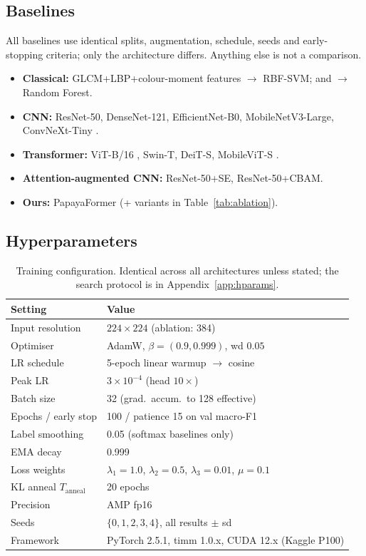\documentclass[10pt,twocolumn,a4paper]{article}
\begin{document}
\subsection{Baselines}
\label{sec:baselines}
All baselines use identical splits, augmentation, schedule, seeds and early-stopping criteria; only the architecture differs. Anything else is not a comparison.
\begin{itemize}[leftmargin=1.1em,itemsep=1pt,topsep=2pt]
\item \textbf{Classical:} GLCM+LBP+colour-moment features $\rightarrow$ RBF-SVM; and $\rightarrow$ Random Forest.
\item \textbf{CNN:} ResNet-50, DenseNet-121, EfficientNet-B0, MobileNetV3-Large, ConvNeXt-Tiny \cite{convnext2022}.
\item \textbf{Transformer:} ViT-B/16 \cite{vit2021}, Swin-T, DeiT-S, MobileViT-S \cite{mobilevit2022}.
\item \textbf{Attention-augmented CNN:} ResNet-50+SE, ResNet-50+CBAM.
\item \textbf{Ours:} PapayaFormer (+ variants in Table~\ref{tab:ablation}).
\end{itemize}

\subsection{Hyperparameters}
\begin{table}[H]
\centering
\caption{Training configuration. Identical across all architectures unless stated; the search protocol is in Appendix~\ref{app:hparams}.}
\label{tab:hparams}
{\footnotesize
\begin{tabularx}{\columnwidth}{@{}p{3.1cm} X@{}}
\toprule
\rowcolor{hdrgray}
Setting & Value \\
\midrule
Input resolution & $224\times224$ (ablation: 384) \\
Optimiser & AdamW, $\beta=(0.9,0.999)$, wd $0.05$ \\
LR schedule & 5-epoch linear warmup $\rightarrow$ cosine \\
Peak LR & $3\times10^{-4}$ (head $10\times$) \\
Batch size & 32 (grad.\ accum.\ to 128 effective) \\
Epochs / early stop & 100 / patience 15 on val macro-F1 \\
Label smoothing & 0.05 (softmax baselines only) \\
EMA decay & 0.999 \\
Loss weights & $\lambda_1{=}1.0$, $\lambda_2{=}0.5$, $\lambda_3{=}0.01$, $\mu{=}0.1$ \\
KL anneal $T_{\text{anneal}}$ & 20 epochs \\
Precision & AMP fp16 \\
Seeds & $\{0,1,2,3,4\}$, all results $\pm$ sd \\
Framework & PyTorch 2.5.1, timm 1.0.x, CUDA 12.x (Kaggle P100) \\
\bottomrule
\end{tabularx}}
\end{table}
\end{document}
